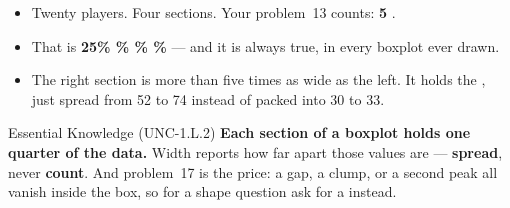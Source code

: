 \documentclass[aspectratio=169, 11pt]{beamer}
\begin{document}
\begin{frame}[t, plain]
  \vspace{6pt}
  \begin{itemize}\setlength{\itemsep}{8pt}
    \item Twenty players. Four sections. Your problem~13 counts: \textbf{5   }.
    \item That is \textbf{25\% \% \% \%} --- and it is always true, in
          every boxplot ever drawn.
    \item The right section is more than five times as wide as the left. It holds the
          , just spread from 52 to 74 instead of packed into 30 to 33.
  \end{itemize}
  \vspace{8pt}
  \begin{block}{Essential Knowledge (UNC-1.L.2)}
    \textbf{Each section of a boxplot holds one quarter of the data.} Width reports how far apart
    those values are --- \textbf{spread}, never \textbf{count}. And problem~17 is the price: a
    gap, a clump, or a second peak all vanish inside the box, so for a shape question ask for a
     instead.
  \end{block}
\end{frame}
\end{document}
